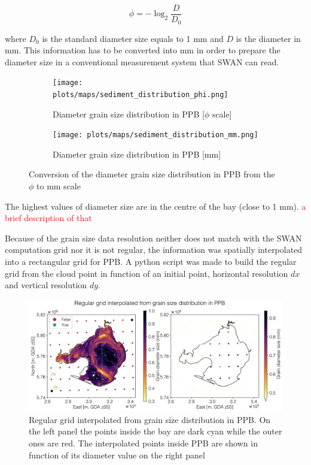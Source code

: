 \documentclass[12pt]{article}
\begin{document}
\begin{equation}
    \phi = - \log_{2}\frac{D}{D_0}
\end{equation}

where $D_0$ is the standard diameter size equals to 1 mm and $D$ is the diameter in mm. This information has to be converted into mm in order to prepare the diameter size in a conventional measurement system that SWAN can read.

\begin{figure}[h]
\centering
\begin{subfigure}{.5\textwidth}
  \centering
  \texttt{[image: plots/maps/sediment\_distribution\_phi.png]}
  \caption{Diameter grain size distribution in PPB [$\phi$ scale]}
  \label{fig:diameter_phi}
\end{subfigure}%
\begin{subfigure}{.5\textwidth}
  \centering
  \texttt{[image: plots/maps/sediment\_distribution\_mm.png]}
  \caption{Diameter grain size distribution in PPB [mm]}
  \label{fig:diameter_mm}
\end{subfigure}
\caption{Conversion of the diameter grain size distribution in PPB from the $\phi$ to mm scale }
\label{fig:diameter_PPB}
\end{figure}

The highest values of diameter size are in the centre of the bay (close to 1 mm). \textcolor{red}{a brief description of that}

Because of the grain size data resolution neither does not match with the SWAN computation grid nor it is not regular, the information was spatially interpolated into a rectangular grid for PPB. A python script was made to build the regular grid from the cloud point in function of an initial point, horizontal resolution $dx$ and vertical resolution $dy$.

\begin{figure}[h]
    \centering
    \includegraphics[scale=0.45]{plots/maps/interpolated_D.png}
    \caption{Regular grid interpolated from grain size distribution in PPB. On the left panel the points inside the bay are dark cyan while the outer ones are red. The interpolated points inside PPB are shown in function of its diameter value on the right panel}
    \label{fig:interpolated_D}
\end{figure}
\end{document}
